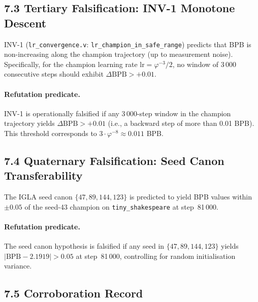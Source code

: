 \subsection{7.3 Tertiary Falsification: INV-1 Monotone Descent}
\label{subsec:ch25-falsify-inv1}

INV-1 (\texttt{lr\_convergence.v}: \texttt{lr\_champion\_in\_safe\_range})
predicts that BPB is non-increasing along the champion trajectory
(up to measurement noise).  Specifically, for the champion learning
rate $\mathrm{lr}=\varphi^{-3}/2$, no window of 3\,000 consecutive
steps should exhibit $\Delta\mathrm{BPB} > +0.01$.

\paragraph{Refutation predicate.}
INV-1 is operationally falsified if any 3\,000-step window in the
champion trajectory yields $\Delta\mathrm{BPB} > +0.01$ (i.e., a
backward step of more than 0.01 BPB).  This threshold corresponds to
$3 \cdot \varphi^{-8} \approx 0.011$ BPB.

\subsection{7.4 Quaternary Falsification: Seed Canon Transferability}
\label{subsec:ch25-falsify-seeds}

The IGLA seed canon $\{47, 89, 144, 123\}$ is predicted to yield
BPB values within $\pm 0.05$ of the seed-43 champion on
\texttt{tiny\_shakespeare} at step~81\,000.

\paragraph{Refutation predicate.}
The seed canon hypothesis is falsified if any seed in
$\{47, 89, 144, 123\}$ yields $|\mathrm{BPB} - 2.1919| > 0.05$
at step~81\,000, controlling for random initialisation variance.

\subsection{7.5 Corroboration Record}
\label{subsec:ch25-corroboration}

